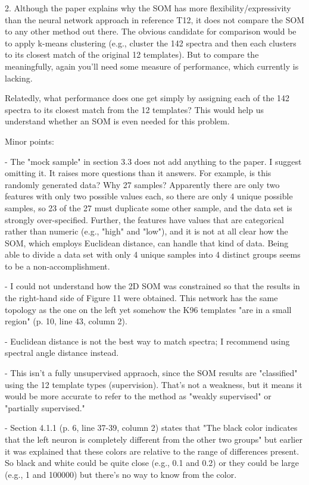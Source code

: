 2. Although the paper explains why the SOM has more flexibility/expressivity than the neural network approach in reference T12, it does not compare the SOM to any other method out there.  The obvious candidate for comparison would be to apply k-means clustering (e.g., cluster the 142 spectra and then each clusters to its closest match of the original 12 templates).  But to compare the meaningfully, again you'll need some measure of performance, which currently is lacking.

Relatedly, what performance does one get simply by assigning each of the 142 spectra to its closest match from the 12 templates?  This would help us understand whether an SOM is even needed for this problem.

Minor points:

- The "mock sample" in section 3.3 does not add anything to the paper.  I suggest omitting it.  It raises more questions than it answers.  For example, is this randomly generated data?  Why 27 samples? Apparently there are only two features with only two possible values each, so there are only 4 unique possible samples, so 23 of the 27 must duplicate some other sample, and the data set is strongly over-specified.  Further, the features have values that are categorical rather than numeric (e.g., "high" and "low"), and it is not at all clear how the SOM, which employs Euclidean distance, can handle that kind of data.  Being able to divide a data set with only 4 unique samples into 4 distinct groups seems to be a non-accomplishment.

- I could not understand how the 2D SOM was constrained so that the results in the right-hand side of Figure 11 were obtained.  This network has the same topology as the one on the left yet somehow the K96 templates "are in a small region" (p. 10, line 43, column 2).

- Euclidean distance is not the best way to match spectra; I recommend using spectral angle distance instead.

- This isn't a fully unsupervised appraoch, since the SOM results are "classified" using the 12 template types (supervision).  That's not a weakness, but it means it would be more accurate to refer to the  method as "weakly supervised" or "partially supervised."

- Section 4.1.1 (p. 6, line 37-39, column 2) states that "The black color indicates that the left neuron is completely different from the other two groups" but earlier it was explained that these colors are relative to the range of differences present.  So black and white could be quite close (e.g., 0.1 and 0.2) or they could be large (e.g., 1 and 100000) but there's no way to know from the color.

